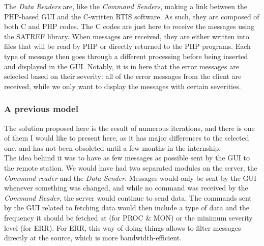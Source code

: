 \documentclass{themeensg}
\begin{document}
The \textit{Data Readers} are, like the \textit{Command Senders}, making a link between the PHP-based GUI and the C-written RTIS software. As such, they are composed of both C and PHP codes. The C codes are just here to receive the messages using the SATREF library. When messages are received, they are either written into files that will be read by PHP or directly returned to the PHP programs.
Each type of message then goes through a different processing before being inserted and displayed in the GUI. Notably, it is in here that the error messages are selected based on their severity: all of the error messages from the client are received, while we only want to display the messages with certain severities.

\subsubsection{A previous model}

The solution proposed here is the result of numerous iterations, and there is one of them I would like to present here, as it has major differences to the selected one, and has not been obsoleted until a few months in the internship.\\

The idea behind it was to have as few messages as possible sent by the GUI to the remote station. We would have had two separated modules on the server, the \textit{Command reader} and the \textit{Data Sender}.
Messages would only be sent by the GUI whenever something was changed, and while no command was received by the \textit{Command Reader}, the server would continue to send data. The commands sent by the GUI related to fetching data would then include a type of data and the frequency it should be fetched at (for PROC \& MON) or the minimum severity level (for ERR). For ERR, this way of doing things allows to filter messages directly at the source, which is more bandwidth-efficient.\\
\end{document}
